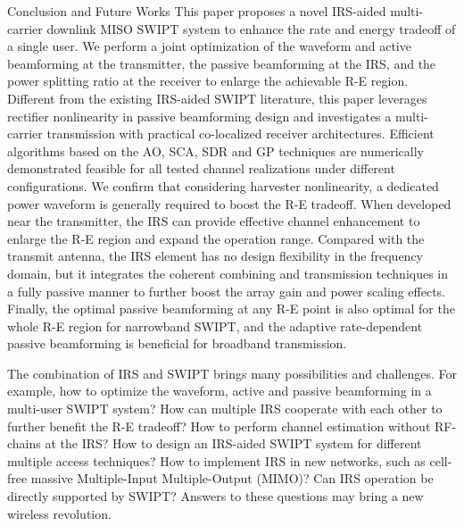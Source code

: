 \documentclass[journal]{IEEEtran}
\begin{document}
	\begin{section}{Conclusion and Future Works}\label{se:conclusion_and_future_works}
		This paper proposes a novel IRS-aided multi-carrier downlink MISO SWIPT system to enhance the rate and energy tradeoff of a single user. We perform a joint optimization of the waveform and active beamforming at the transmitter, the passive beamforming at the IRS, and the power splitting ratio at the receiver to enlarge the achievable R-E region. Different from the existing IRS-aided SWIPT literature, this paper leverages rectifier nonlinearity in passive beamforming design and investigates a multi-carrier transmission with practical co-localized receiver architectures. Efficient algorithms based on the AO, SCA, SDR and GP techniques are numerically demonstrated feasible for all tested channel realizations under different configurations. We confirm that considering harvester nonlinearity, a dedicated power waveform is generally required to boost the R-E tradeoff. When developed near the transmitter, the IRS can provide effective channel enhancement to enlarge the R-E region and expand the operation range. Compared with the transmit antenna, the IRS element has no design flexibility in the frequency domain, but it integrates the coherent combining and transmission techniques in a fully passive manner to further boost the array gain and power scaling effects. Finally, the optimal passive beamforming at any R-E point is also optimal for the whole R-E region for narrowband SWIPT, and the adaptive rate-dependent passive beamforming is beneficial for broadband transmission.

		The combination of IRS and SWIPT brings many possibilities and challenges. For example, how to optimize the waveform, active and passive beamforming in a multi-user SWIPT system? How can multiple IRS cooperate with each other to further benefit the R-E tradeoff? How to perform channel estimation without RF-chains at the IRS? How to design an IRS-aided SWIPT system for different multiple access techniques? How to implement IRS in new networks, such as cell-free massive Multiple-Input Multiple-Output (MIMO)? Can IRS operation be directly supported by SWIPT? Answers to these questions may bring a new wireless revolution.
	\end{section}


	
	
\end{document}
